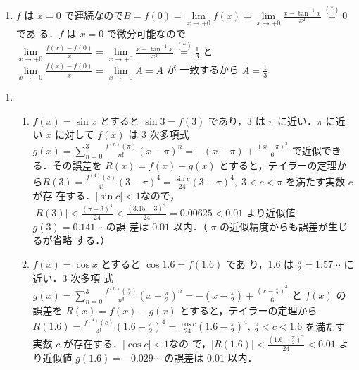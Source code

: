 \documentclass[11pt, uplatex, dvipdfmx, twoside]{jsarticle}
\newcommand{\ds}{\displaystyle}
\renewcommand{\dlim}{\lim\limits} %
\begin{document}
\begin{enumerate}[label=\ref{sec:hospital}.\arabic*]
\begin{enumerate}[label=(\arabic*)]
  \item $f$ は $x=0$
    で連続なので$B=f(0) = \dlim_{x \to +0} f(x) = \dlim_{x \to +0}
    \frac{x-\tan^{-1}x}{x^2} \overset{(\ast)}{=} 0$ であ
    る．$f$ は $x=0$
    で微分可能なので$\dlim_{x \to +0}\frac{f(x)-f(0)}{x} = \dlim_{x
      \to +0} \frac{x-\tan^{-1}x}{x^3} \overset{(\ast)}{=} \frac{1}{3}$
    と$\dlim_{x \to -0} \frac{f(x)-f(0)}{x} = \dlim_{x \to -0} A=A$ が
    一致するから $A=\frac{1}{3}$.
    
  \end{enumerate}
\end{enumerate}

\newpage

\begin{enumerate}[label=\ref{sec:taylor}.\arabic*]
  \setlength{\itemsep}{1ex}
  
\item
  \begin{enumerate}[label=(\arabic*)]

    \setlength{\itemsep}{1ex}
    
  \item $f(x) = \sin x$ とすると $\sin 3 = f(3)$ であり，$3$ は $\pi$
    に近い．$\pi$ に近い $x$ に対して $f(x)$ は $3$ 次多項式
    $g(x) = {\ds \sum_{n=0}^{3}} \frac{f^{(n)}(\pi)}{n!} (x-\pi)^n=
    -(x-\pi) + \frac{(x-\pi)^3}{6} $ で近似できる．その誤差を $R(x) =
    f(x) - g(x)$
    とすると，テイラーの定理から$R(3) = \frac{f^{(4)}(c)}{4!}(3-\pi)^4
    = \frac{\sin c}{24}(3-\pi)^4, \; 3 < c < \pi$ を満たす実数 $c$ が存
    在する．$|\sin c|
    <1$なので，$|R(3)| < \frac{(\pi-3)^4}{24}<
    \frac{(3.15-3)^4}{24}=0.00625 < 0.01$ より近似値 $g(3)= 0.141\cdots$ の誤
    差は $0.01$ 以内．（ $\pi$ の近似精度からも誤差が生じるが省略
    する．）

  \item $f(x) = \cos x$ とすると $\cos 1.6 = f(1.6)$ であ
    り，$1.6$ は $\frac{\pi}{2}=1.57\cdots $ に近い．$3$ 次多項
    式
    $g(x) = {\ds \sum_{n=0}^{3}}
    \frac{f^{(n)}\left(\frac{\pi}{2}\right)}{n!}\left(x-\frac{\pi}{2}\right)^n
    = -\left(x-\frac{\pi}{2}\right) +
    \frac{\left(x-\frac{\pi}{2}\right)^3}{6}$ と $f(x)$ の誤差を
    $R(x) = f(x) - g(x)$
    とすると，テイラーの定理から$R(1.6) =
    \frac{f^{(4)}(c)}{4!}\left(1.6-\frac{\pi}{2}\right)^4 = \frac{
      \cos c}{24}\left( 1.6-\frac{\pi}{2}\right)^4 , \, \frac{\pi}{2}
    < c < 1.6$ を満たす実数 $c$ が存在する．$|\cos c| <1$なの
    で，$|R(1.6)| < \frac{\left(1.6 - \frac{\pi}{2}\right)^4}{24} <
    0.01$ より近似値 $g(1.6)=-0.029\cdots$ の誤差は $0.01$ 以内．


\end{enumerate}
\end{enumerate}
\end{document}
